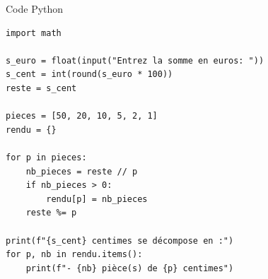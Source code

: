 \documentclass[12pt,a4paper]{article}
\begin{document}
\begin{ansbox}{Code Python}
\begin{verbatim}
import math

s_euro = float(input("Entrez la somme en euros: "))
s_cent = int(round(s_euro * 100))
reste = s_cent

pieces = [50, 20, 10, 5, 2, 1]
rendu = {}

for p in pieces:
    nb_pieces = reste // p
    if nb_pieces > 0:
        rendu[p] = nb_pieces
    reste %= p

print(f"{s_cent} centimes se décompose en :")
for p, nb in rendu.items():
    print(f"- {nb} pièce(s) de {p} centimes")

\end{verbatim}
\end{ansbox}
\end{document}
